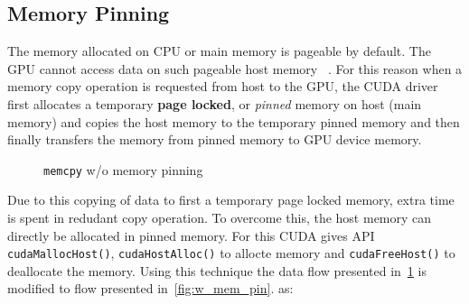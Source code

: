 \subsection{Memory Pinning}\label{memory_pinning}
The memory allocated on CPU or main memory is pageable by default. The GPU cannot
access data on such pageable host memory~\cite{datatransferoptimization}
\cite{programmingguidecuda}. For this reason when a memory copy operation is requested
from host to the GPU, the CUDA driver first allocates a temporary \textbf{page locked},
or \textit{pinned} memory on host (main memory) and copies the host memory to the
temporary pinned memory and then finally transfers the memory from pinned memory
to GPU device memory.
\begin{figure}[h] %
  \caption{\texttt{memcpy} w/o memory pinning}\label{fig:wo_mem_pin}
\end{figure}

Due to this copying of data to first a temporary page locked memory, extra time
is spent in redudant copy operation. To overcome this, the host memory can directly
be allocated in pinned memory. For this CUDA gives API \texttt{cudaMallocHost()},
\texttt{cudaHostAlloc()} to allocte memory and \texttt{cudaFreeHost()} to deallocate
the memory. Using this technique the data flow presented in~\ref{fig:wo_mem_pin} is
modified to flow presented in~\ref{fig:w_mem_pin}.
as:

